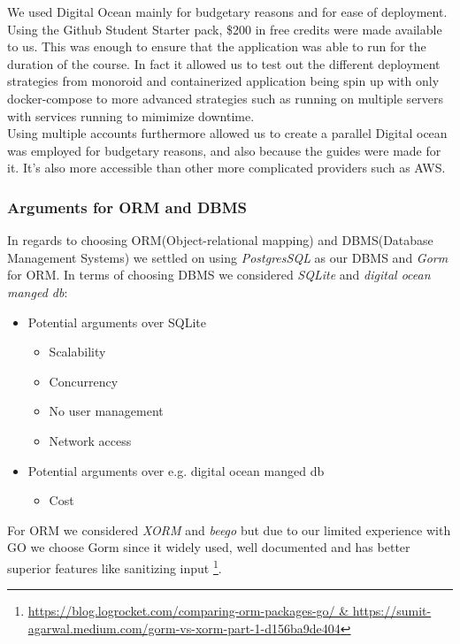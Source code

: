 We used Digital Ocean mainly for budgetary reasons and for ease of deployment. Using the Github Student 
Starter pack, \$200 in free credits were made available to us. This was enough to ensure that the application 
was able to run for the duration of the course. In fact it allowed us to test out the different deployment strategies
from monoroid and containerized application being spin up with only docker-compose to more advanced strategies such as
running on multiple servers with services running to mimimize downtime.\\

Using multiple accounts furthermore allowed us to create a parallel Digital ocean was employed for budgetary reasons, and also because the guides were made for it.
It's also more accessible than other more complicated providers such as AWS. 

\subsubsection{Arguments for ORM and DBMS}
In regards to choosing ORM(Object-relational mapping) and DBMS(Database Management Systems) we settled on 
using \textit{PostgresSQL} as our DBMS and \textit{Gorm} for ORM. In terms of choosing DBMS we considered 
\textit{SQLite} and \textit{digital ocean manged db}:
\begin{itemize}
    \item Potential arguments over SQLite 
    \begin{itemize}
        \item Scalability
        \item Concurrency
        \item No user management
        \item Network access        
    \end{itemize}
    \item Potential arguments over e.g. digital ocean manged db
    \begin{itemize}
        \item Cost
    \end{itemize}
\end{itemize}

For ORM we considered \textit{XORM} and \textit{beego} but due to our limited experience with GO we choose Gorm 
since it widely used, well documented and has better superior features like sanitizing input \footnote{\url{https://blog.logrocket.com/comparing-orm-packages-go/ & https://sumit-agarwal.medium.com/gorm-vs-xorm-part-1-d156ba9de404}}.


